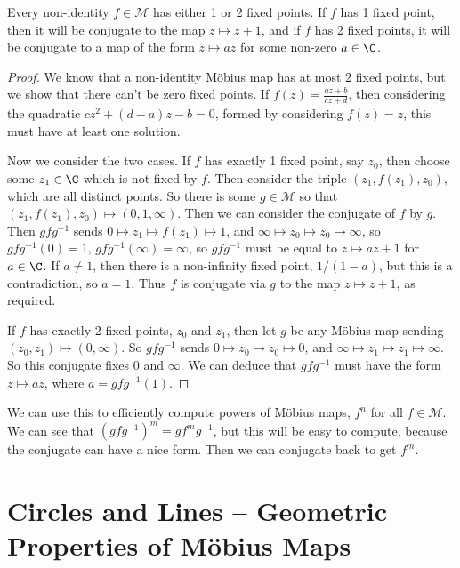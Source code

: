\documentclass[a4]{scrreprt}
\begin{document}
\begin{theorem}
	Every non-identity $f \in \mathcal{M}$ has either 1 or 2 fixed points. If $f$ has 1 fixed point, then it will be conjugate to the map $z \mapsto z + 1$, and if $f$ has 2 fixed points, it will be conjugate to a map of the form $z \mapsto az$ for some non-zero $a \in \C$.
\end{theorem}
\begin{proof}
	We know that a non-identity Möbius map has at most 2 fixed points, but we show that there can't be zero fixed points. If $f(z) = \frac{az + b}{cz + d}$, then considering the quadratic $cz^2 + (d - a)z - b = 0$, formed by considering $f(z) = z$, this must have at least one solution.

	Now we consider the two cases. If $f$ has exactly 1 fixed point, say $z_0$, then choose some $z_1 \in \C$ which is not fixed by $f$. Then consider the triple $(z_1, f(z_1), z_0)$, which are all distinct points.  So there is some $g \in \mathcal{M}$ so that $(z_1, f(z_1), z_0) \mapsto (0, 1, \infty)$.
	Then we can consider the conjugate of $f$ by $g$. Then $gfg^{-1}$ sends $0 \mapsto z_1 \mapsto f(z_1) \mapsto 1$, and $\infty \mapsto z_0 \mapsto z_0 \mapsto \infty$, so $gfg^{-1}(0) = 1$, $gfg^{-1}(\infty) = \infty$, so $gfg^{-1}$ must be equal to $z \mapsto az + 1$ for $a \in \C$. If $a \neq 1$, then there is a non-infinity fixed point, $1/(1 - a)$, but this is a contradiction, so $a = 1$. Thus $f$ is conjugate via $g$ to the map $z \mapsto z + 1$, as required.

	If $f$ has exactly 2 fixed points, $z_0$ and $z_1$, then let $g$ be any Möbius map sending $(z_0, z_1) \mapsto (0, \infty)$. So $gfg^{-1}$ sends $0 \mapsto z_0 \mapsto z_0 \mapsto 0$, and $\infty \mapsto z_1 \mapsto z_1 \mapsto \infty$. So this conjugate fixes $0$ and $\infty$. We can deduce that $gfg^{-1}$ must have the form $z \mapsto az$, where $a = gfg^{-1}(1)$.
\end{proof}

We can use this to efficiently compute powers of Möbius maps, $f^n$ for all $f \in \mathcal{M}$. 
We can see that $(gfg^{-1})^m = gf^m g^{-1}$, but this will be easy to compute, because the conjugate can have a nice form. Then we can conjugate back to get $f^m$.


\section{Circles and Lines -- Geometric Properties of Möbius Maps}
\end{document}
